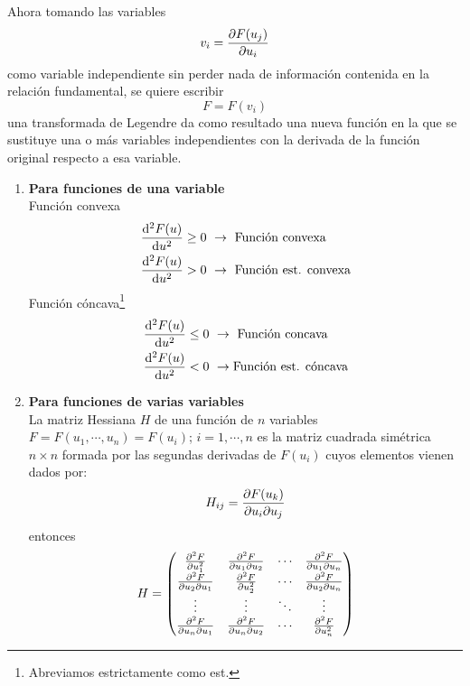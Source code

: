 \documentclass[../main]{subfiles}
\begin{document}
Ahora tomando las variables 
\begin{equation}
    v_i=\pdv{F(u_j)}{u_i}
\end{equation}
como variable independiente sin perder nada de información contenida en la relación fundamental, se quiere escribir 
\begin{equation}
    F=F(v_i)
\end{equation}
una transformada de Legendre da como resultado una nueva función en la que se sustituye una o más variables independientes con la derivada de la función original respecto a esa variable.
\begin{enumerate}
    \item \textbf{Para funciones de una variable}\\
    Función convexa
    \begin{equation}
        \begin{split}
            \dv{^2 F(u)}{u^2}&\geq 0 \ \rightarrow \ \text{Función convexa}\\
            \dv{^2 F(u)}{u^2}&>0 \ \rightarrow \ \text{Función est. convexa}
        \end{split}
    \end{equation}
    Función cóncava\footnote{Abreviamos estrictamente como est.}
    \begin{equation}
        \begin{split}
            \dv{^2 F(u)}{u^2}&\leq 0 \ \rightarrow \ \text{Función concava}\\
            \dv{^2 F(u)}{u^2}&<0 \ \rightarrow \text{Función est. cóncava}
        \end{split}
    \end{equation}
    \item \textbf{Para funciones de varias variables}\\
    La matriz Hessiana $H$ de una función de $n$ variables $F=F(u_1, \cdots, u_n)=F(u_i)$; $i=1, \cdots, n$ es la matriz cuadrada simétrica $n\times n$ formada por las segundas derivadas de $F(u_i)$ cuyos elementos vienen dados por:
    \begin{equation}
        H_{ij}=\pdv{F(u_k)}{u_i \partial u_j}
    \end{equation}
    entonces 
    \begin{equation}
        H=
        \begin{pmatrix}
            \pdv{^2 F}{u^2_1} & \pdv{^2 F}{u_1 \partial u_2} &\cdots & \pdv{^2 F}{u_1 \partial u_n} \\
            \pdv{^2 F}{u_2 \partial u_1} & \pdv{^2 F}{u^2_2} &\cdots & \pdv{^2 F}{u_2 \partial u_n} \\
            \vdots & \vdots &\ddots & \vdots \\
            \pdv{^2 F}{u_n \partial u_1} & \pdv{^2 F}{u_n \partial u_2} &\cdots & \pdv{^2 F}{u^2_n}
        \end{pmatrix}
    \end{equation}
\end{enumerate}
\end{document}

